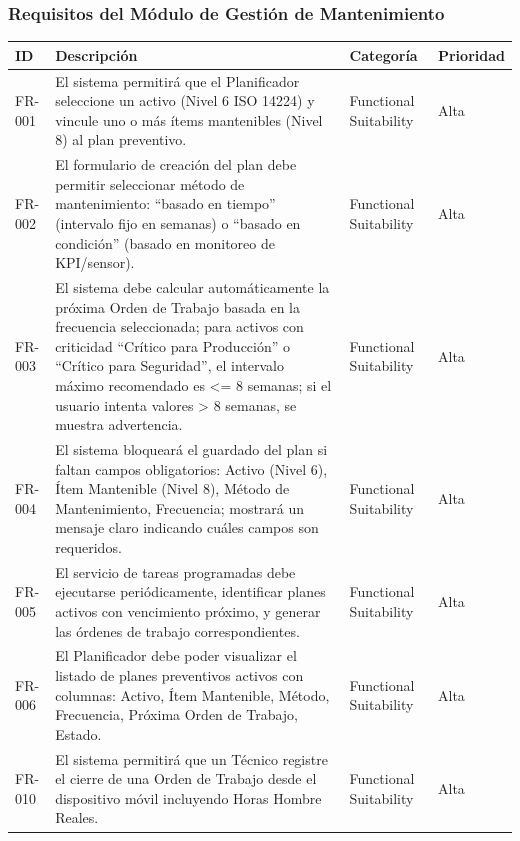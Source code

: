 \subsubsection{Requisitos del Módulo de Gestión de Mantenimiento}
\footnotesize
\begin{longtable}{>{\raggedright\arraybackslash}p{} >{\raggedright\arraybackslash}p{} >{\raggedright\arraybackslash}p{} >{\raggedright\arraybackslash}p{}}
\toprule
\rowcolor{gray!15}\textbf{ID} & \textbf{Descripción} & \textbf{Categoría} & \textbf{Prioridad} \\ \midrule
\endhead
FR-001 & El sistema permitirá que el Planificador seleccione un activo (Nivel 6 ISO 14224) y vincule uno o más ítems mantenibles (Nivel 8) al plan preventivo. & Functional Suitability & Alta \\
FR-002 & El formulario de creación del plan debe permitir seleccionar método de mantenimiento: ``basado en tiempo'' (intervalo fijo en semanas) o ``basado en condición'' (basado en monitoreo de KPI/sensor). & Functional Suitability & Alta \\
FR-003 & El sistema debe calcular automáticamente la próxima Orden de Trabajo basada en la frecuencia seleccionada; para activos con criticidad ``Crítico para Producción'' o ``Crítico para Seguridad'', el intervalo máximo recomendado es <= 8 semanas; si el usuario intenta valores > 8 semanas, se muestra advertencia. & Functional Suitability & Alta \\
FR-004 & El sistema bloqueará el guardado del plan si faltan campos obligatorios: Activo (Nivel 6), Ítem Mantenible (Nivel 8), Método de Mantenimiento, Frecuencia; mostrará un mensaje claro indicando cuáles campos son requeridos. & Functional Suitability & Alta \\
FR-005 & El servicio de tareas programadas debe ejecutarse periódicamente, identificar planes activos con vencimiento próximo, y generar las órdenes de trabajo correspondientes. & Functional Suitability & Alta \\
FR-006 & El Planificador debe poder visualizar el listado de planes preventivos activos con columnas: Activo, Ítem Mantenible, Método, Frecuencia, Próxima Orden de Trabajo, Estado. & Functional Suitability & Alta \\
FR-010 & El sistema permitirá que un Técnico registre el cierre de una Orden de Trabajo desde el dispositivo móvil incluyendo Horas Hombre Reales. & Functional Suitability & Alta \\

\end{longtable}
